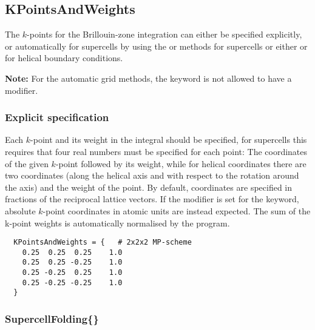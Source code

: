 \subsection{KPointsAndWeights}
\label{sec:dftbp.KPointsAndWeights}

The $k$-points for the Brillouin-zone integration can either be specified
explicitly, or automatically for supercells by using the 
or  methods for supercells or either  or
 for helical boundary conditions.

\textbf{ Note:} For the automatic grid methods, the 
keyword is not allowed to have a modifier.

\subsubsection{Explicit specification}

Each $k$-point and its weight in the integral should be specified, for
supercells this requires that four real numbers must be specified for
each point: The coordinates of the given $k$-point followed by its
weight, while for helical coordinates there are two coordinates (along
the helical axis and with respect to the rotation around the axis) and
the weight of the point. By default, coordinates are specified in
fractions of the reciprocal lattice vectors. If the modifier
 is set for the  keyword, absolute
$k$-point coordinates in atomic units are instead expected.  The sum
of the k-point weights is automatically normalised by the program.
\begin{verbatim}
  KPointsAndWeights = {   # 2x2x2 MP-scheme
    0.25  0.25  0.25    1.0
    0.25  0.25 -0.25    1.0
    0.25 -0.25  0.25    1.0
    0.25 -0.25 -0.25    1.0
  }
\end{verbatim}

\subsubsection{SupercellFolding\{\}}
\label{sec:dftbp.SupercellFolding}

